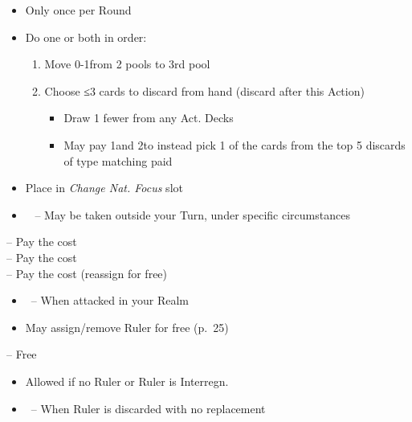 \documentclass[10pt]{article}
\begin{document}
\begin{itemize}
	\item Only once per Round
	\item Do one or both in order:
	\begin{enumerate}
		\item Move 0-1\monarchpower from 2 pools to 3rd pool
		\item Choose ≤3 cards to discard from hand (discard after this Action)
		\begin{itemize}
			\item Draw 1 fewer from any Act. Decks
			\item May pay 1\monarchpower and 2\ducats to instead pick 1 of the cards from the top 5 discards of type matching paid \monarchpower
		\end{itemize}
	\end{enumerate}
	\item Place \cube in \emph{Change Nat. Focus} slot
\end{itemize}

\begin{itemize}
	\item \reaction~ -- May be taken outside your Turn, under specific circumstances
\end{itemize}
 -- Pay the \ducat cost\\
 -- Pay the \milpower cost\\
 -- Pay the \milpower cost (reassign for free)\\
\begin{itemize}
	\item \reaction~-- When attacked in your Realm
	\item May assign/remove Ruler for free (p.~25)
\end{itemize}
 -- Free
\begin{itemize}
	\item Allowed if no Ruler or Ruler is \dprime Interregn.\dprime
	\item \reaction~-- When Ruler is discarded with no replacement
\end{itemize}
\end{document}
